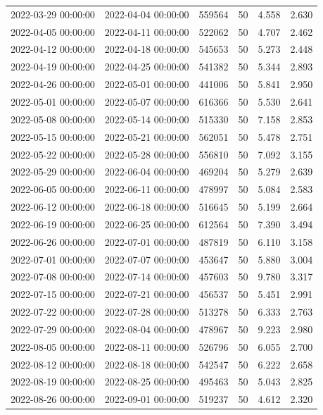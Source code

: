 \begin{tabular}{llrrrr}
2022-03-29 00:00:00 & 2022-04-04 00:00:00 & 559564 & 50 & 4.558 & 2.630 \\
2022-04-05 00:00:00 & 2022-04-11 00:00:00 & 522062 & 50 & 4.707 & 2.462 \\
2022-04-12 00:00:00 & 2022-04-18 00:00:00 & 545653 & 50 & 5.273 & 2.448 \\
2022-04-19 00:00:00 & 2022-04-25 00:00:00 & 541382 & 50 & 5.344 & 2.893 \\
2022-04-26 00:00:00 & 2022-05-01 00:00:00 & 441006 & 50 & 5.841 & 2.950 \\
2022-05-01 00:00:00 & 2022-05-07 00:00:00 & 616366 & 50 & 5.530 & 2.641 \\
2022-05-08 00:00:00 & 2022-05-14 00:00:00 & 515330 & 50 & 7.158 & 2.853 \\
2022-05-15 00:00:00 & 2022-05-21 00:00:00 & 562051 & 50 & 5.478 & 2.751 \\
2022-05-22 00:00:00 & 2022-05-28 00:00:00 & 556810 & 50 & 7.092 & 3.155 \\
2022-05-29 00:00:00 & 2022-06-04 00:00:00 & 469204 & 50 & 5.279 & 2.639 \\
2022-06-05 00:00:00 & 2022-06-11 00:00:00 & 478997 & 50 & 5.084 & 2.583 \\
2022-06-12 00:00:00 & 2022-06-18 00:00:00 & 516645 & 50 & 5.199 & 2.664 \\
2022-06-19 00:00:00 & 2022-06-25 00:00:00 & 612564 & 50 & 7.390 & 3.494 \\
2022-06-26 00:00:00 & 2022-07-01 00:00:00 & 487819 & 50 & 6.110 & 3.158 \\
2022-07-01 00:00:00 & 2022-07-07 00:00:00 & 453647 & 50 & 5.880 & 3.004 \\
2022-07-08 00:00:00 & 2022-07-14 00:00:00 & 457603 & 50 & 9.780 & 3.317 \\
2022-07-15 00:00:00 & 2022-07-21 00:00:00 & 456537 & 50 & 5.451 & 2.991 \\
2022-07-22 00:00:00 & 2022-07-28 00:00:00 & 513278 & 50 & 6.333 & 2.763 \\
2022-07-29 00:00:00 & 2022-08-04 00:00:00 & 478967 & 50 & 9.223 & 2.980 \\
2022-08-05 00:00:00 & 2022-08-11 00:00:00 & 526796 & 50 & 6.055 & 2.700 \\
2022-08-12 00:00:00 & 2022-08-18 00:00:00 & 542547 & 50 & 6.222 & 2.658 \\
2022-08-19 00:00:00 & 2022-08-25 00:00:00 & 495463 & 50 & 5.043 & 2.825 \\
2022-08-26 00:00:00 & 2022-09-01 00:00:00 & 519237 & 50 & 4.612 & 2.320 \\

\end{tabular}
